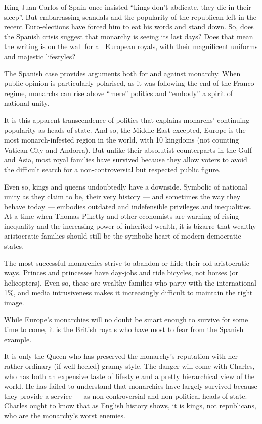 \documentclass[UTF8,11pt]{ctexart}
\begin{document}
King Juan Carlos of Spain once insisted “kings don’t abdicate, they die in their sleep”. But embarrassing scandals and the popularity of the republican left in the recent Euro-elections have forced him to eat his words and stand down. So, does the Spanish crisis suggest that monarchy is seeing its last days? Does that mean the writing is on the wall for all European royals, with their magnificent uniforms and majestic lifestyles?


The Spanish case provides arguments both for and against monarchy. When public opinion is particularly polarised, as it was following the end of the Franco regime, monarchs can rise above “mere” politics and “embody” a spirit of national unity.


It is this apparent transcendence of politics that explains monarchs’ continuing popularity as heads of state. And so, the Middle East excepted, Europe is the most monarch-infested region in the world, with 10 kingdoms (not counting Vatican City and Andorra). But unlike their absolutist counterparts in the Gulf and Asia, most royal families have survived because they allow voters to avoid the difficult search for a non-controversial but respected public figure.


Even so, kings and queens undoubtedly have a downside. Symbolic of national unity as they claim to be, their very history — and sometimes the way they behave today — embodies outdated and indefensible privileges and inequalities. At a time when Thomas Piketty and other economists are warning of rising inequality and the increasing power of inherited wealth, it is bizarre that wealthy aristocratic families should still be the symbolic heart of modern democratic states.


The most successful monarchies strive to abandon or hide their old aristocratic ways. Princes and princesses have day-jobs and ride bicycles, not horses (or helicopters). Even so, these are wealthy families who party with the international 1\%, and media intrusiveness makes it increasingly difficult to maintain the right image.


While Europe’s monarchies will no doubt be smart enough to survive for some time to come, it is the British royals who have most to fear from the Spanish example.


It is only the Queen who has preserved the monarchy’s reputation with her rather ordinary (if well-heeled) granny style. The danger will come with Charles, who has both an expensive taste of lifestyle and a pretty hierarchical view of the world. He has failed to understand that monarchies have largely survived because they provide a service — as non-controversial and non-political heads of state. Charles ought to know that as English history shows, it is kings, not republicans, who are the monarchy’s worst enemies.
\end{document}
